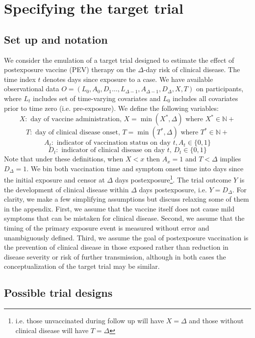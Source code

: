 \documentclass[11pt]{article}
\begin{document}
\section{Specifying the target trial}

\subsection{Set up and notation} \label{sec:setup}
We consider the emulation of a target trial designed to estimate the effect of postexposure vaccine (PEV) therapy on the $\Delta$-day risk of clinical disease. The time index $t$ denotes days since exposure to a case. We have available observational data $O=\left(L_0, A_0, D_1 \ldots, L_{\Delta-1}, A_{\Delta-1}, D_{\Delta}, X, T\right)$ on participants, where $L_t$ includes set of time-varying covariates and $L_0$ includes all covariates prior to time zero (i.e. pre-exposure). We define the following variables:
$$X: \text{ day of vaccine administration, } X = \operatorname{min}(X^*, \Delta) \text{ where } X^* \in \mathbb{N}+$$
$$T: \text{ day of clinical disease onset, } T = \operatorname{min}(T^*, \Delta) \text{ where } T^* \in \mathbb{N}+$$
$$A_t: \text{ indicator of vaccination status on day }t, A_t \in \{0, 1\}$$
$$D_t: \text{ indicator of clinical disease on day $t$, } D_t \in \{0, 1\}$$
Note that under these definitions, when $X < x$ then $A_x = 1$ and $T < \Delta$ implies $D_{\Delta} = 1$. We bin both vaccination time and symptom onset time into days since the initial exposure and censor at $\Delta$ days postexposure\footnote{i.e. those unvaccinated during follow up will have $X = \Delta$ and those without clinical disease will have $T = \Delta$}. The trial outcome $Y$ is the development of clinical disease within $\Delta$ days postexposure, i.e. $Y=D_{\Delta}$. For clarity, we make a few simplifying assumptions but discuss relaxing some of them in the appendix. First, we assume that the vaccine itself does not cause mild symptoms that can be mistaken for clinical disease. Second, we assume that the timing of the primary exposure event is measured without error and unambiguously defined. Third, we assume the goal of postexposure vaccination is the prevention of clinical disease in those exposed rather than reduction in disease severity or risk of further transmission, although in both cases the conceptualization of the target trial may be similar.

\subsection{Possible trial designs}
\end{document}
